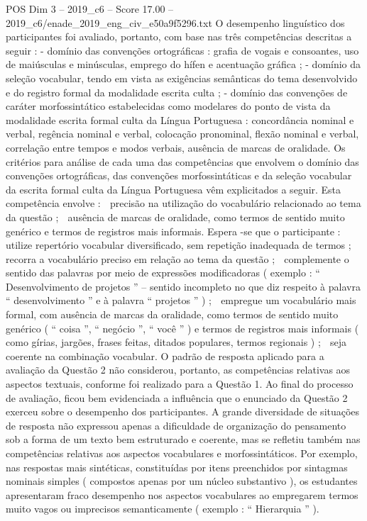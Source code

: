 \begin{textsample}{POS Dim 3 – 2019\_c6 – Score 17.00 – 2019\_c6/enade\_2019\_eng\_civ\_e50a9f5296.txt}
O desempenho linguístico dos participantes foi avaliado, portanto, com base nas três competências descritas a seguir : - domínio das convenções ortográficas : grafia de vogais e consoantes, uso de maiúsculas e minúsculas, emprego do hífen e acentuação gráfica ; - domínio da seleção vocabular, tendo em vista as exigências semânticas do tema desenvolvido e do registro formal da modalidade escrita culta ; - domínio das convenções de caráter morfossintático estabelecidas como modelares do ponto de vista da modalidade escrita formal culta da Língua Portuguesa : concordância nominal e verbal, regência nominal e verbal, colocação pronominal, flexão nominal e verbal, correlação entre tempos e modos verbais, ausência de marcas de oralidade.
Os critérios para análise de cada uma das competências que envolvem o domínio das convenções ortográficas, das convenções morfossintáticas e da seleção vocabular da escrita formal culta da Língua Portuguesa vêm explicitados a seguir.
Esta competência envolve :  precisão na utilização do vocabulário relacionado ao tema da questão ;  ausência de marcas de oralidade, como termos de sentido muito genérico e termos de registros mais informais.
Espera -se que o participante :  utilize repertório vocabular diversificado, sem repetição inadequada de termos ;  recorra a vocabulário preciso em relação ao tema da questão ;  complemente o sentido das palavras por meio de expressões modificadoras ( exemplo : “ Desenvolvimento de projetos ” – sentido incompleto no que diz respeito à palavra “ desenvolvimento ” e à palavra “ projetos ” ) ;  empregue um vocabulário mais formal, com ausência de marcas da oralidade, como termos de sentido muito genérico ( “ coisa ”, “ negócio ”, “ você ” ) e termos de registros mais informais ( como gírias, jargões, frases feitas, ditados populares, termos regionais ) ;  seja coerente na combinação vocabular.
O padrão de resposta aplicado para a avaliação da Questão 2 não considerou, portanto, as competências relativas aos aspectos textuais, conforme foi realizado para a Questão 1.
Ao final do processo de avaliação, ficou bem evidenciada a influência que o enunciado da Questão 2 exerceu sobre o desempenho dos participantes.
A grande diversidade de situações de resposta não expressou apenas a dificuldade de organização do pensamento sob a forma de um texto bem estruturado e coerente, mas se refletiu também nas competências relativas aos aspectos vocabulares e morfossintáticos.
Por exemplo, nas respostas mais sintéticas, constituídas por itens preenchidos por sintagmas nominais simples ( compostos apenas por um núcleo substantivo ), os estudantes apresentaram fraco desempenho nos aspectos vocabulares ao empregarem termos muito vagos ou imprecisos semanticamente ( exemplo : “ Hierarquia ” ).

\end{textsample}
